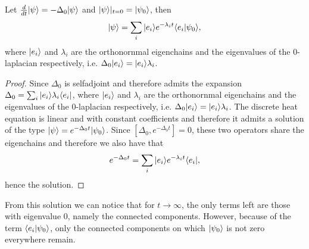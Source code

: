 \documentclass[../2.tex]{subfiles}
\begin{document}
    \begin{prop}
        Let $\frac{d}{dt}| \psi \rangle = -\Delta_0 | \psi \rangle$ and $| \psi \rangle|_{t = 0} = | \psi_0 \rangle$, then
        \[ | \psi \rangle = \sum_i| e_i \rangle e^{-\lambda_i t}\langle e_i | \psi_0 \rangle, \]
        where $| e_i \rangle$ and $\lambda_i$ are the orthonornmal eigenchains and the eigenvalues of the $0$-laplacian respectively,
        i.e. $\Delta_0| e_i \rangle =| e_i \rangle\lambda_i$.
    \end{prop}
    \begin{proof}
        Since $\Delta_0$ is selfadjoint and therefore admits the expansion $\Delta_0 = \sum_i | e_i \rangle\lambda_i\langle e_i |$,
        where $| e_i \rangle$ and $\lambda_i$ are the orthonornmal eigenchains and the eigenvalues of the $0$-laplacian respectively,
        i.e. $\Delta_0| e_i \rangle =| e_i \rangle\lambda_i$. The discrete heat equation is linear and with constant coefficients and therefore
        it admits a solution of the type $| \psi \rangle = e^{-\Delta_0 t}| \psi_0 \rangle$.
        Since $[\Delta_0, e^{-\Delta_0 t}] = 0$, these two operators share the eigenchains and therefore we also have that
        \[ e^{-\Delta_0 t} = \sum_i | e_i \rangle e^{-\lambda_i t} \langle e_i |,\]
        hence the solution. \qedhere
    \end{proof}

    From this solution we can notice that for $t \to \infty$, the only terms left are those with eigenvalue $0$, namely the connected components.
    However, because of the term $\langle e_i | \psi_0 \rangle$, only the connected components on which $| \psi_0 \rangle$ is not zero everywhere remain.
\end{document}
